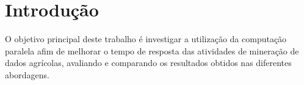 \chapter{Introdução}


O objetivo principal deste trabalho é investigar a utilização da computação paralela afim de melhorar o tempo de resposta das atividades de mineração de dados agrícolas, avaliando e comparando os resultados obtidos nas diferentes abordagens. 